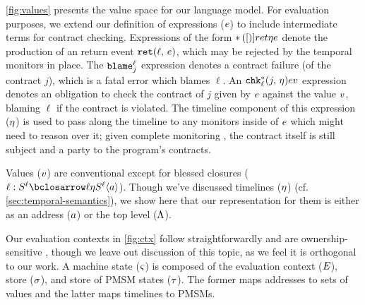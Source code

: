 %
\autoref{fig:values} presents the value space for our language model.
%
For evaluation purposes, we extend our definition of expressions ($e$) to include intermediate terms for contract checking.
%
Expressions of the form ${\tt *}{\,}({[})]{ret}{\eta}{e}$ denote the production of an return event ${\tt ret}(\ell,\, e)$, which may be rejected by the temporal monitors in place.
%
The ${\tt blame}^{\ell}_{j}$ expression denotes a contract failure (of the contract $j$), which is a fatal error which blames $\ell$.
%
An ${\tt chk}{^{*}_{\ell}}({j,\, \eta}){e}{v}$ expression denotes an obligation to check the contract of $j$ given by $e$ against the value $v$, blaming $\ell$ if the contract is violated.
%
The timeline component of this expression ($\eta$) is used to pass along the timeline to any monitors inside of $e$ which might need to reason over it; given complete monitoring \cite{ianjohnson:dthf:complete}, the contract itself is still subject and a party to the program's contracts.
%

%
Values ($v$) are conventional except for blessed closures ($\bclos{\mmlab}{\mscon}{\mmlab}{\mmlab}{\mtimeline}{\mscon}{\mmlab}{\maddr}$).
%
Though we've discussed timelines ($\eta$) (cf. \autoref{sec:temporal-semantics}), we show here that our representation for them is either as an address ($a$) or the top level ($\Lambda$).
%

%
Our evaluation contexts in \autoref{fig:ctx} follow straightforwardly and are ownership-sensitive \cite{ianjohnson:dthf:complete}, though we leave out discussion of this topic, as we feel it is orthogonal to our work.
%
A machine state ($\varsigma$) is composed of the evaluation context ($\mathit{E}$), store ($\sigma$), and store of PMSM states ($\tau$).
%
The former maps addresses to sets of values and the latter maps timelines to PMSMs.
%

